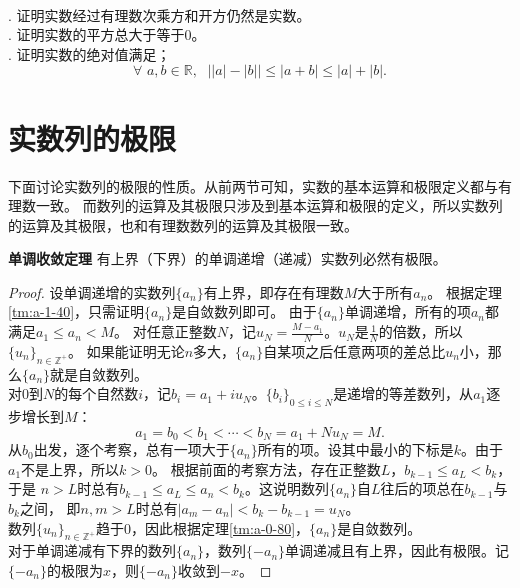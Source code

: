 \documentclass[12pt,UTF8,fontset=none]{ctexbook}
\begin{document}
\begin{appendix}
\begin{xt}
    \mbox{} \\
    . 证明实数经过有理数次乘方和开方仍然是实数。\\
    . 证明实数的平方总大于等于$0$。\\
    . 证明实数的绝对值满足；
    $$\forall \,\, a, b\in\mathbb{R}, \;\,\, \big||a| - |b|\big| \leqslant |a + b| \leqslant |a| + |b|.$$
\end{xt}

\section{实数列的极限}
下面讨论实数列的极限的性质。从前两节可知，实数的基本运算和极限定义都与有理数一致。
而数列的运算及其极限只涉及到基本运算和极限的定义，所以实数列的运算及其极限，也和有理数数列的运算及其极限一致。

\begin{tm}\textbf{单调收敛定理}\label{tm:a-2-10}
    有上界（下界）的单调递增（递减）实数列必然有极限。
\end{tm}
\begin{proof}
    设单调递增的实数列$\{a_n\}$有上界，即存在有理数$M$大于所有$a_n$。
    根据定理\ref{tm:a-1-40}，只需证明$\{a_n\}$是自敛数列即可。
    由于$\{a_n\}$单调递增，所有的项$a_n$都满足$a_1\leqslant a_n < M$。
    对任意正整数$N$，记$u_N = \frac{M - a_1}{N}$。$u_N$是$\frac{1}{N}$的倍数，所以$\{u_n\}_{n\in\mathbb{Z}^+}$。
    如果能证明无论$n$多大，$\{a_n\}$自某项之后任意两项的差总比$u_n$小，那么$\{a_n\}$就是自敛数列。\\
    对$0$到$N$的每个自然数$i$，记$b_i = a_1 + iu_N$。$\{b_i\}_{0\leqslant i\leqslant N}$是递增的等差数列，从$a_1$逐步增长到$M$：
    $$ a_1 = b_0 < b_1 < \cdots < b_N = a_1 + Nu_N = M.$$
    从$b_0$出发，逐个考察，总有一项大于$\{a_n\}$所有的项。设其中最小的下标是$k$。由于$a_1$不是上界，所以$k>0$。
    根据前面的考察方法，存在正整数$L$，$b_{k-1} \leqslant a_L < b_k$，于是
    $n>L$时总有$b_{k-1} \leqslant a_L \leqslant a_n < b_k$。这说明数列$\{a_n\}$自$L$往后的项总在$b_{k-1}$与$b_k$之间，
    即$n,m>L$时总有$|a_m - a_n| < b_k - b_{k-1} = u_N$。\\
    数列$\{u_n\}_{n\in\mathbb{Z}^+}$趋于$0$，因此根据定理\ref{tm:a-0-80}，$\{a_n\}$是自敛数列。\\
    对于单调递减有下界的数列$\{a_n\}$，数列$\{-a_n\}$单调递减且有上界，因此有极限。记$\{-a_n\}$的极限为$x$，则$\{-a_n\}$收敛到$-x$。
\end{proof}


\end{appendix}
\end{document}
